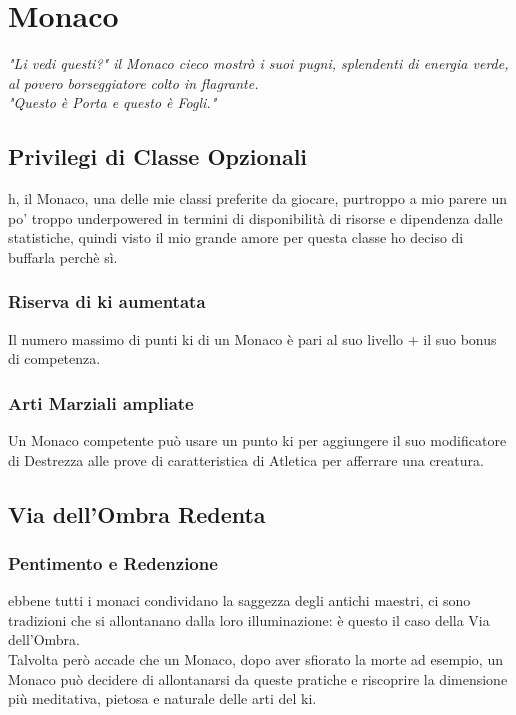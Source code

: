 \chapter{Monaco}

\begin{DndReadAloud}
  \it
  "Li vedi questi?" il Monaco cieco mostrò i suoi pugni, splendenti di energia verde, al povero borseggiatore colto in flagrante. \\ "Questo è Porta e questo è Fogli."
\end{DndReadAloud}

\section{Privilegi di Classe Opzionali}

h, il Monaco, una delle mie classi preferite da giocare, purtroppo a mio parere un po' troppo underpowered in termini di disponibilità di risorse e dipendenza dalle statistiche, quindi visto il mio grande amore per questa classe ho deciso di buffarla perchè sì.

\subsection{Riserva di ki aumentata}

Il numero massimo di punti ki di un Monaco è pari al suo livello + il suo bonus di competenza.

\subsection{Arti Marziali ampliate}

Un Monaco competente può usare un punto ki per aggiungere il suo modificatore di Destrezza alle prove di caratteristica di Atletica per afferrare una creatura.

\section{Via dell'Ombra Redenta}

\subsection{Pentimento e Redenzione}

ebbene tutti i monaci condividano la saggezza degli antichi maestri, ci sono tradizioni che si allontanano dalla loro illuminazione: è questo il caso della Via dell'Ombra. \\ Talvolta però accade che un Monaco, dopo aver sfiorato la morte ad esempio, un Monaco può decidere di allontanarsi da queste pratiche e riscoprire la dimensione più meditativa, pietosa e naturale delle arti del ki.

